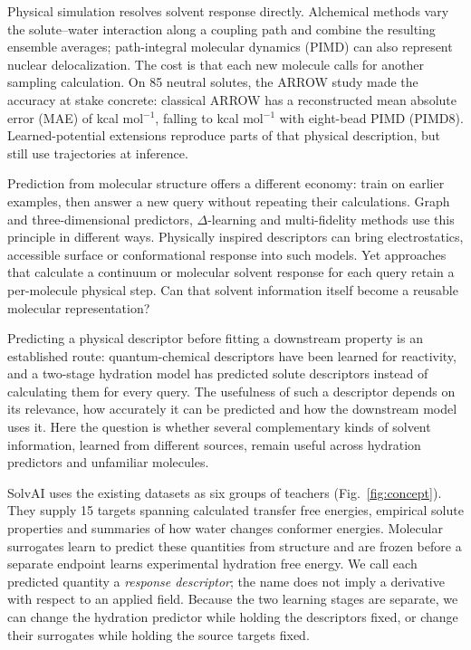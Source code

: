 \documentclass[12pt]{article}
\begin{document}
Physical simulation resolves solvent response directly. Alchemical methods vary
the solute--water interaction along a coupling path and combine the resulting
ensemble averages; path-integral molecular dynamics (PIMD) can also represent
nuclear delocalization.\cite{mbar2008,nqereview2018} The cost is that each new
molecule calls for another sampling calculation. On 85 neutral solutes, the ARROW
study made the accuracy at stake concrete: classical ARROW has a reconstructed
mean absolute error (MAE) of \ClassicalMAE{} kcal mol$^{-1}$, falling to
\PIMDMAE{} kcal mol$^{-1}$ with eight-bead PIMD (PIMD8).\cite{arrow2022}
Learned-potential extensions reproduce parts of that physical description, but
still use trajectories at inference.\cite{arrownn2023,nqe2024}

Prediction from molecular structure offers a different economy: train on earlier
examples, then answer a new query without repeating their calculations. Graph and
three-dimensional predictors, $\Delta$-learning and multi-fidelity methods use
this principle in different ways.\cite{ramakrishnan2015,combisolv2021,rauer2020,ward2021}
Physically inspired descriptors can bring electrostatics, accessible surface or
conformational response into such models.\cite{mldescriptors2023,fml2021}
Yet approaches that calculate a continuum or molecular solvent response for each
query retain a per-molecule physical step.\cite{hybridfepml2020,mlpcm2021,rism2020,imperham2022}
Can that solvent information itself become a reusable molecular representation?

Predicting a physical descriptor before fitting a downstream property is an
established route: quantum-chemical descriptors have been learned for reactivity,
and a two-stage hydration model has predicted solute descriptors instead of
calculating them for every query.\cite{mlqmgnn2022,twostagehfe2026}
The usefulness of such a descriptor depends on its relevance, how accurately it
can be predicted and how the downstream model uses it.\cite{qmhelp2024,surrogatelatent2025}
Here the question is whether several complementary kinds of solvent information,
learned from different sources, remain useful across hydration predictors and
unfamiliar molecules.

SolvAI uses the existing datasets as six groups of teachers (Fig.~\ref{fig:concept}).
They supply 15 targets spanning calculated transfer free energies, empirical
solute properties and summaries of how water changes conformer energies. Molecular
surrogates learn to predict these quantities from structure and are frozen before
a separate endpoint learns experimental hydration free energy. We call each
predicted quantity a \emph{response descriptor}; the name does not imply a
derivative with respect to an applied field. Because the two learning stages are
separate, we can change the hydration predictor while holding the descriptors
fixed, or change their surrogates while holding the source targets fixed.
\end{document}
